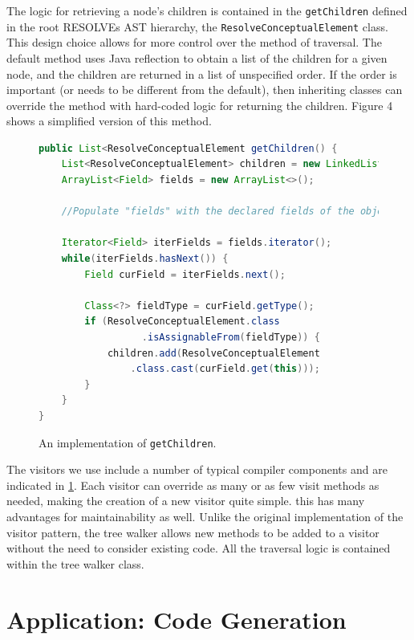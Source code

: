\documentclass[times]{speauth}
\begin{document}
The logic for retrieving a node's children is contained in the \texttt{getChildren} defined in the root RESOLVEs AST hierarchy, the \texttt{ResolveConceptualElement} class. This design choice allows for more control over the method of traversal. The default method uses Java reflection to obtain a list of the children for a given node, and the children are returned in a list of unspecified order. If the order is important (or needs to be different from the default), then inheriting classes can override the method with hard-coded logic for returning the children. Figure 4 shows a simplified version of this method.

\begin{figure}[!htb]
\centering
\begin{minipage}{.80\textwidth}
\begin{lstlisting}[language=java]
public List<ResolveConceptualElement getChildren() {
    List<ResolveConceptualElement> children = new LinkedList<>();
    ArrayList<Field> fields = new ArrayList<>();
    
    //Populate "fields" with the declared fields of the object's defining class
    
    Iterator<Field> iterFields = fields.iterator();
    while(iterFields.hasNext()) {
        Field curField = iterFields.next();
        
        Class<?> fieldType = curField.getType();
        if (ResolveConceptualElement.class
                  .isAssignableFrom(fieldType)) {
            children.add(ResolveConceptualElement
                .class.cast(curField.get(this)));
        }
    }
}
\end{lstlisting}
\end{minipage}
\caption{An implementation of \texttt{getChildren}.}
\label{fig:getchildren}
\end{figure}


The visitors we use include a number of typical compiler components and are indicated in \ref{fig:getchildren}. Each visitor can override as many or as few visit methods as needed, making the creation of a new visitor quite simple. this has many advantages for maintainability as well. Unlike the original implementation of the visitor pattern, the tree walker allows new methods to be added to a visitor without the need to consider existing code. All the traversal logic is contained within the tree walker class. 

\section{Application: Code Generation}
\vspace{-2pt}
\end{document}
